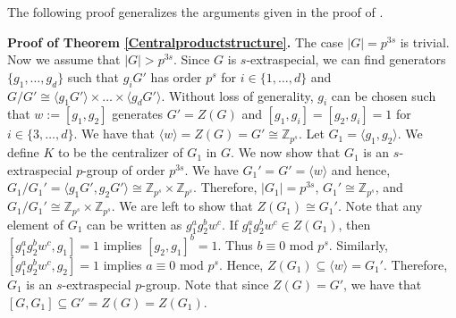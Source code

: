 \documentclass[preprint,sort&compress,12pt]{elsarticle}
\numberwithin{equation}{section}
\theoremstyle{definition}
\begin{document}
The following proof generalizes the arguments given in the proof of \cite[Theorem 3.3.4]{Karp1987}.

\noindent \textbf{Proof of Theorem \ref{Centralproductstructure}.}
    The case $|G| =p^{3s}$ is trivial. Now we assume that ${|G|  > p^{3s}}$. Since $G$ is $s$-extraspecial, we can find generators $\{g_1,\ldots,g_d\}$ such that $g_iG'$ has order $p^s$ for $i \in \{1,\ldots,d\}$ and ${G/G' \cong \langle g_1G' \rangle \times \ldots \times \langle g_dG'\rangle}$. 
    Without loss of generality, $g_i$ can be chosen such that $w:=[g_1,g_2]$ generates $G'=Z(G)$ and ${[g_1,g_i]=[g_2,g_i]=1}$ for ${i \in \{3,\ldots,d\}}$.
    We have that ${\langle w \rangle = Z(G)= G' \cong \mathbb{Z}_{p^s}}$. Let $G_1=\langle g_1,g_2 \rangle$. We define $K$ to be the centralizer of $G_1$ in $G$.
    We now show that $G_1$ is an $s$-extraspecial $p$-group of order $p^{3s}$. 
    We have  ${G_1'=G' = \langle w \rangle}$ and hence, 
    ${G_1/G_1'=\langle g_1G',g_2G'\rangle \cong \mathbb{Z}_{p^s} \times \mathbb{Z}_{p^s}}$.
    Therefore, $|G_1|=p^{3s}$, ${G_1' \cong \mathbb{Z}_{p^s}}$, and ${G_1/G_1' \cong \mathbb{Z}_{p^s} \times \mathbb{Z}_{p^s}}$. We are left to show that ${Z(G_1) \cong G_1'}$. Note that any element of $G_1$ can be written as $g_1^ag_2^bw^c$.
    If $g_1^ag_2^bw^c \in Z(G_1)$, then $[g_1^ag_2^bw^c,g_1]=1$ implies $[g_2,g_1]^b =1$. Thus ${b \equiv 0 }$ mod ${p^s}$. Similarly, $[g_1^ag_2^bw^c,g_2]=1$ implies $a \equiv 0$ mod $p^s$. Hence, $Z(G_1)  \subseteq \langle w \rangle = G_1'$. Therefore, $G_1$ is an $s$-extraspecial $p$-group. Note that since $Z(G)=G'$, we have that ${[G,G_1] \subseteq G' =Z(G)=Z(G_1)}$. 
    
\end{document}
